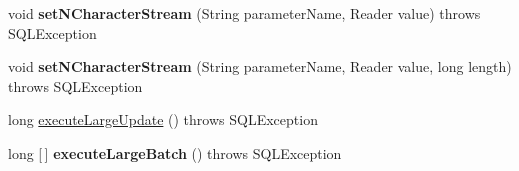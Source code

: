 \begin{DoxyCompactItemize}
\item 
\mbox{\label{classcom_1_1mysql_1_1jdbc_1_1_callable_statement_ac6d8ec22ea382269a824dce8234fe964}} 
void {\bfseries set\+N\+Character\+Stream} (String parameter\+Name, Reader value)  throws S\+Q\+L\+Exception 
\item 
\mbox{\label{classcom_1_1mysql_1_1jdbc_1_1_callable_statement_aaa55ef0fa6bf19fa29b733ad90dabb64}} 
void {\bfseries set\+N\+Character\+Stream} (String parameter\+Name, Reader value, long length)  throws S\+Q\+L\+Exception 
\item 
long \mbox{\hyperlink{classcom_1_1mysql_1_1jdbc_1_1_callable_statement_a6826c04d2f3f824c01d57e21c6f68cca}{execute\+Large\+Update}} ()  throws S\+Q\+L\+Exception 
\item 
\mbox{\label{classcom_1_1mysql_1_1jdbc_1_1_callable_statement_a339021db114a9fd834dd76964e1f4686}} 
long \mbox{[}$\,$\mbox{]} {\bfseries execute\+Large\+Batch} ()  throws S\+Q\+L\+Exception 
\end{DoxyCompactItemize}
